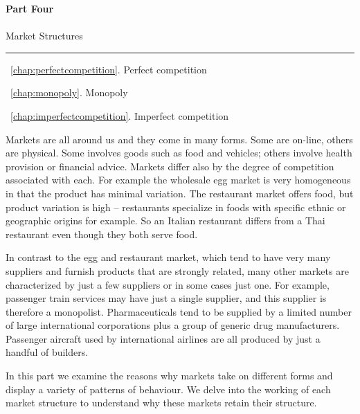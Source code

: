 \cleardoublepage
\thispagestyle{empty}
\vspace{30mm}
{\color{parttextcolour}\fontsize{1.25cm}{3em}\selectfont\textbf{Part Four}} \\ \\
{\color{parttextcolour}\huge Market Structures}

\vspace{10mm}
{\color{partlinecolour}\rule{25em}{2pt}}
\vspace{10mm}

{\large\color{parttextcolour}
~\ref{chap:perfectcompetition}. Perfect competition

~\ref{chap:monopoly}. Monopoly

~\ref{chap:imperfectcompetition}. Imperfect competition}

\vspace{10mm}

{\normalfont Markets are all around us and they come in many forms. Some are on-line, others are physical. Some involves goods such as food and vehicles; others involve health provision or financial advice. Markets differ also by the degree of competition associated with each. For example the wholesale egg market is very homogeneous in that the product has minimal variation. The restaurant market offers food, but product variation is high -- restaurants specialize in foods with specific ethnic or geographic origins for example. So an Italian restaurant differs from a Thai restaurant even though they both serve food. 

In contrast to the egg and restaurant market, which tend to have very many suppliers and furnish products that are strongly related, many other markets are characterized by just a few suppliers or in some cases just one. For example, passenger train services may have just a single supplier, and this supplier is therefore a monopolist. Pharmaceuticals tend to be supplied by a limited number of large international corporations plus a group of generic drug manufacturers. Passenger aircraft used by international airlines are all produced by just a handful of builders.

In this part we examine the reasons why markets take on different forms and display a variety of patterns of behaviour. We delve into the working of each market structure to understand why these markets retain their structure.}
